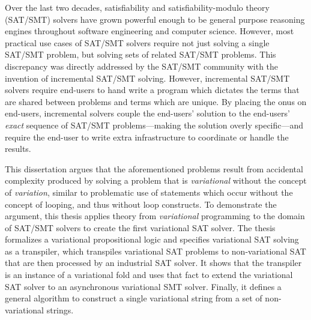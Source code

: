 Over the last two decades, satisfiability and satisfiability-modulo theory
(SAT/SMT) solvers have grown powerful enough to be general purpose reasoning
engines throughout software engineering and computer science. However, most
practical use cases of SAT/SMT solvers require not just solving a single SAT/SMT
problem, but solving sets of related SAT/SMT problems. This discrepancy was
directly addressed by the SAT/SMT community with the invention of incremental
SAT/SMT solving. However, incremental SAT/SMT solvers require end-users to hand
write a program which dictates the terms that are shared between problems and
terms which are unique. By placing the onus on end-users, incremental solvers
couple the end-users' solution to the end-users' \emph{exact} sequence of
SAT/SMT problems---making the solution overly specific---and require the
end-user to write extra infrastructure to coordinate or handle the results.

This dissertation argues that the aforementioned problems result from accidental
complexity produced by solving a problem that is \emph{variational} without the
concept of \emph{variation}, similar to problematic use of  statements
which occur without the concept of looping, and thus without  loop
constructs. To demonstrate the argument, this thesis applies theory from
\emph{variational} programming to the domain of SAT/SMT solvers to create the
first variational SAT solver.
%
The thesis formalizes a variational propositional logic and specifies
variational SAT solving as a transpiler, which transpiles variational SAT
problems to non-variational SAT that are then processed by an industrial SAT
solver. It shows that the transpiler is an instance of a variational fold and
uses that fact to extend the variational SAT solver to an asynchronous
variational SMT solver. Finally, it defines a general algorithm to construct a
single variational string from a set of non-variational strings.


